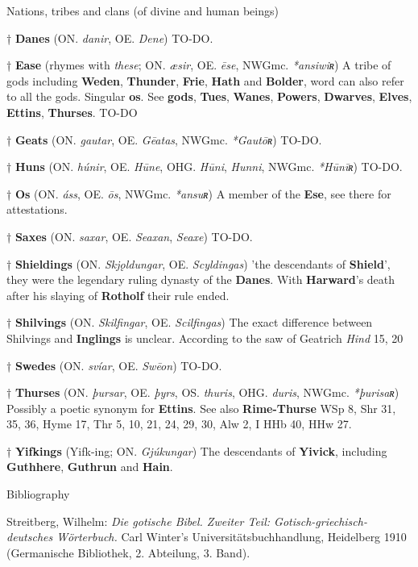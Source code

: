 Nations, tribes and clans (of divine and human beings)

† \textbf{Danes} (ON. \emph{danir}, OE. \emph{Dene})
 TO-DO.

† \textbf{Ease} (rhymes with \emph{these}; ON. \emph{æsir}, OE. \emph{ēse}, NWGmc. \emph{*ansiwiʀ})
 A tribe of gods including \textbf{Weden}, \textbf{Thunder}, \textbf{Frie}, \textbf{Hath} and \textbf{Bolder}, word can also refer to all the gods. Singular \textbf{os}. See \textbf{gods}, \textbf{Tues}, \textbf{Wanes}, \textbf{Powers}, \textbf{Dwarves}, \textbf{Elves}, \textbf{Ettins}, \textbf{Thurses}.
 TO-DO
 
† \textbf{Geats} (ON. \emph{gautar}, OE. \emph{Gēatas}, NWGmc. \emph{*Gautōʀ})
 TO-DO.

† \textbf{Huns} (ON. \emph{húnir}, OE. \emph{Hūne}, OHG. \emph{Hūni}, \emph{Hunni}, NWGmc. \emph{*Hūnīʀ})
 TO-DO.
 
† \textbf{Os} (ON. \emph{áss}, OE. \emph{ōs}, NWGmc. \emph{*ansuʀ})
 A member of the \textbf{Ese}, see there for attestations.
 
† \textbf{Saxes} (ON. \emph{saxar}, OE. \emph{Seaxan}, \emph{Seaxe})
 TO-DO.
 
† \textbf{Shieldings} (ON. \emph{Skjǫldungar}, OE. \emph{Scyldingas})
 'the descendants of \textbf{Shield}', they were the legendary ruling dynasty of the \textbf{Danes}. With \textbf{Harward}'s death after his slaying of \textbf{Rotholf} their rule ended.
 
† \textbf{Shilvings} (ON. \emph{Skilfingar}, OE. \emph{Scilfingas})
 The exact difference between Shilvings and \textbf{Inglings} is unclear. According to the saw of Geatrich
 \emph{Hind} 15, 20

† \textbf{Swedes} (ON. \emph{svíar}, OE. \emph{Swēon})
 TO-DO.

† \textbf{Thurses} (ON. \emph{þursar}, OE. \emph{þyrs}, OS. \emph{thuris}, OHG. \emph{duris}, NWGmc. \emph{*þurisaʀ})
 Possibly a poetic synonym for \textbf{Ettins}. See also \textbf{Rime-Thurse}
 WSp 8, Shr 31, 35, 36, Hyme 17, Thr 5, 10, 21, 24, 29, 30, Alw 2, I HHb 40, HHw 27.

† \textbf{Yifkings} (Yifk-ing; ON. \emph{Gjúkungar})
 The descendants of \textbf{Yivick}, including \textbf{Guthhere}, \textbf{Guthrun} and \textbf{Hain}.



Bibliography

Streitberg, Wilhelm: \emph{Die gotische Bibel. Zweiter Teil: Gotisch-griechisch-deutsches Wörterbuch.} Carl Winter's Universitätsbuchhandlung, Heidelberg 1910 (Germanische Bibliothek, 2. Abteilung, 3. Band).
